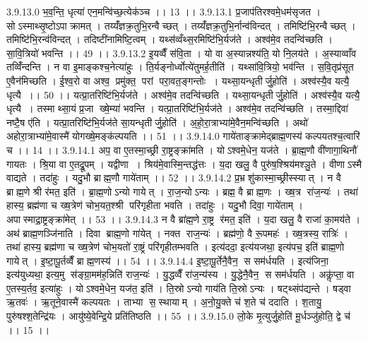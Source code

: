 3.9.13.0
भ॒व॒न्ति॒ धृत्या॑ एन॒मन्वि॑च्छ॒त्येक॑ञ्च ।। 13 ।।
3.9.13.1
प्र॒जाप॑तिरश्वमे॒धम॑सृजत । सोऽस्माथ्सृ॒ष्टोऽपाक्रामत् । तय्यँ॑ज्ञक्र॒तुभि॒रन्वैच्छत् । तय्यँ॑ज्ञक्र॒तुभि॒र्नान्व॑विन्दत् । तमिष्टि॑भि॒रन्वैच्छत् । तमिष्टि॑भि॒रन्व॑विन्दत् । तदिष्टी॑नामिष्टि॒त्वम् । यथ्स॑व्वँथ्स॒रमिष्टि॑भि॒र्यज॑ते । अश्व॑मे॒व तदन्वि॑च्छति । सा॒वि॒त्रियो॑ भवन्ति ।। 49 ।।
3.9.13.2
इ॒यव्वैँ स॑वि॒ता । यो वा अ॒स्यान्नश्य॑ति॒ यो नि॒लय॑ते । अ॒स्याव्वाँव तव्विँ॑न्दन्ति । न वा इ॒माङ्कश्च॒नेत्या॑हुः । ति॒र्यङ्नोर्ध्वोत्ये॑तुमर्ह॒तीति॑ । यथ्सा॑वि॒त्रियो॒ भव॑न्ति । स॒वि॒तृप्र॑सूत ए॒वैन॑मिच्छति । ई॒श्व॒रो वा अश्व॒ प्रमु॑क्त॒ परां परा॒वत॒ङ्गन्तोः । यथ्सा॒यन्धृतीर्जु॒होति॑ । अश्व॑स्यै॒व यत्यै॒ धृत्यै ।। 50 ।। यत्प्रा॒तरिष्टि॑भि॒र्यज॑ते । अश्व॑मे॒व तदन्वि॑च्छति । यथ्सा॒यन्धृतीर्जु॒होति॑ । अश्व॑स्यै॒व यत्यै॒ धृत्यै । तस्माथ्सा॒यं प्र॒जा ख्षे॒म्या॑ भवन्ति । यत्प्रा॒तरिष्टि॑भि॒र्यज॑ते । अश्व॑मे॒व तदन्वि॑च्छति । तस्मा॒द्दिवा॑ नष्टै॒ष ए॑ति । यत्प्रा॒तरिष्टि॑भि॒र्यज॑ते सा॒यन्धृतीर्जु॒होति॑ । अ॒हो॒रा॒त्राभ्या॑मे॒वैन॒मन्वि॑च्छति । अथो॑ अहोरा॒त्राभ्या॑मे॒वास्मै॑ योगख्षे॒मङ्क॑ल्पयति ।। 51 ।।
3.9.14.0
गाये॑ताङ्क्रामेद्ब्राह्म॒णस्य॑ कल्पयतश्च॒त्वारि॑ च ।। 14 ।।
3.9.14.1
अप॒ वा ए॒तस्मा॒च्छ्री रा॒ष्ट्रङ्क्रा॑मति । योऽश्वमे॒धेन॒ यज॑ते । ब्रा॒ह्म॒णौ वी॑णागा॒थिनौ॑ गायतः । श्रि॒या वा ए॒तद्रू॒पम् । यद्वीणा । श्रिय॑मे॒वास्मि॒न्तद्ध॑त्तः । य॒दा खलु॒ वै पुरु॑ष॒श्श्रिय॑मश्ञु॒ते । वीणाऽस्मै वाद्यते । तदा॑हुः । यदु॒भौ ब्राह्म॒णौ गाये॑ताम् ।। 52 ।।
3.9.14.2
प्र॒भ्रशु॑कास्मा॒च्छ्रीस्स्यात् । न वै ब्राह्म॒णे श्री र॑मत॒ इति॑ । ब्रा॒ह्म॒णोऽन्यो गायेत् । रा॒ज॒न्योऽन्यः । ब्रह्म॒ वै ब्राह्म॒णः । ख्ष॒त्र रा॑ज॒न्यः॑ । तथा॑ हास्य॒ ब्रह्म॑णा च ख्ष॒त्रेण॑ चोभ॒यत॒श्श्री परि॑गृहीता भवति । तदा॑हुः । यदु॒भौ दिवा॒ गाये॑ताम् । अपास्माद्रा॒ष्ट्रङ्क्रा॑मेत् ।। 53 ।।
3.9.14.3
न वै ब्रा॑ह्म॒णे रा॒ष्ट्र र॑मत॒ इति॑ । य॒दा खलु॒ वै राजा॑ का॒मय॑ते । अथ॑ ब्राह्म॒णञ्जि॑नाति । दिवा ब्राह्म॒णो गा॑येत् । नक्त॑ राज॒न्यः॑ । ब्रह्म॑णो॒ वै रू॒पमहः॑ । ख्ष॒त्रस्य॒ रात्रिः॑ । तथा॑ हास्य॒ ब्रह्म॑णा च ख्ष॒त्रेण॑ चोभ॒यतो॑ रा॒ष्ट्रं परि॑गृहीतम्भवति । इत्य॑ददा॒ इत्य॑यजथा॒ इत्य॑पच॒ इति॑ ब्राह्म॒णो गायेत् । इ॒ष्टा॒पू॒र्तव्वैँ ब्राह्म॒णस्य॑ ।। 54 ।।
3.9.14.4
इ॒ष्टा॒पू॒र्तेनै॒वैन॒॒ स सम॑र्धयति । इत्य॑जिना॒ इत्य॑युध्यथा॒ इत्य॒मु स॑ङ्ग्रा॒मम॑ह॒न्निति॑ राज॒न्यः॑ । यु॒द्धव्वैँ रा॑ज॒न्य॑स्य । यु॒द्धेनै॒वैन॒॒ स सम॑र्धयति । अकॢ॑प्ता॒ वा ए॒तस्य॒र्तव॒ इत्या॑हुः । योऽश्वमे॒धेन॒ यज॑त॒ इति॑ । ति॒स्रोऽन्यो गाय॑ति ति॒स्रोऽन्यः । षट्थ्संप॑द्यन्ते । षड्वा ऋ॒तवः॑ । ऋ॒तूने॒वास्मै॑ कल्पयतः । ताभ्या॑ स॒॒स्थायाम् । अ॒नो॒यु॒क्ते च॑ श॒ते च॑ ददाति । श॒तायु॒ पुरु॑षश्श॒तेन्द्रि॑यः । आयु॑ष्ये॒वेन्द्रि॒ये प्रति॑तिष्ठति ।। 55 ।।
3.9.15.0
लो॒के मृ॒त्युर्जु॒होति॑ मू॒र्धञ्जु॑होति॒ द्वे च॑ ।। 15 ।।
